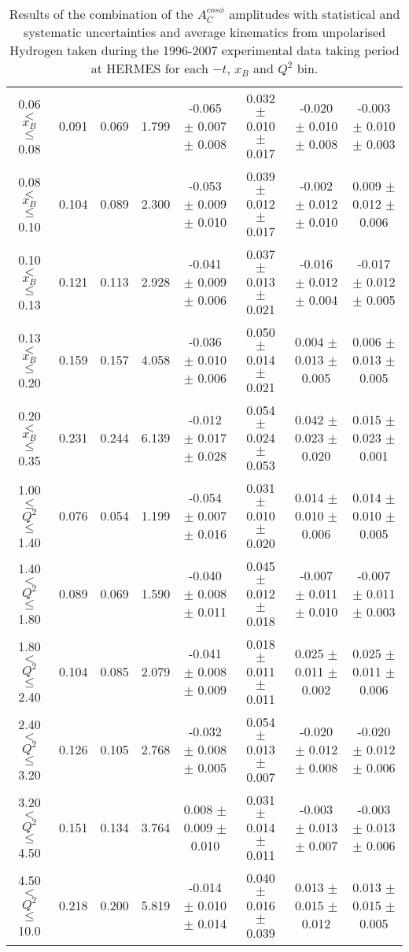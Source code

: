 {\begin{table}[width=15cm]
\begin{center}
{\begin{tabular}{|c|c|c|c|c|c|c|c|}
0.06 $<$ $x_{B}$ $\leqslant$ 0.08 &  0.091 & 0.069 &  1.799 &   -0.065  $\pm$  0.007  $\pm$   0.008 &
0.032  $\pm$  0.010  $\pm$   0.017 & -0.020  $\pm$ 0.010  $\pm$   0.008 & -0.003   $\pm$  0.010   $\pm$   0.003\\
0.08 $<$ $x_{B}$ $\leqslant$ 0.10 &  0.104 & 0.089 &  2.300 &  -0.053  $\pm$  0.009  $\pm$   0.010 & 
0.039  $\pm$  0.012  $\pm$   0.017 & -0.002 $\pm$  0.012 $\pm$    0.010 & 0.009   $\pm$  0.012    $\pm$  0.006\\
0.10 $<$ $x_{B}$ $\leqslant$ 0.13 &  0.121 &  0.113 &  2.928 &  -0.041  $\pm$  0.009  $\pm$   0.006 & 
0.037  $\pm$  0.013 $\pm$   0.021 & -0.016 $\pm$  0.012  $\pm$   0.004 & -0.017   $\pm$  0.012  $\pm$    0.005\\
0.13 $<$ $x_{B}$ $\leqslant$ 0.20 &  0.159 & 0.157 &  4.058&   -0.036   $\pm$ 0.010  $\pm$   0.006 & 
0.050  $\pm$  0.014 $\pm$    0.021 & 0.004  $\pm$  0.013  $\pm$   0.005 & 0.006   $\pm$  0.013   $\pm$  0.005\\
0.20 $<$ $x_{B}$ $\leqslant$ 0.35 &  0.231 & 0.244 &  6.139 &  -0.012 $\pm$  0.017   $\pm$  0.028 & 
0.054  $\pm$  0.024   $\pm$    0.053 & 0.042  $\pm$  0.023  $\pm$   0.020 & 0.015  $\pm$   0.023  $\pm$   0.001\\
\hline
1.00 $\leqslant$ $Q^{2}$ $\leqslant$ 1.40 &  0.076 & 0.054  & 1.199 &  -0.054  $\pm$  0.007  $\pm$   0.016 & 
0.031  $\pm$  0.010  $\pm$   0.020 &  0.014 $\pm$  0.010  $\pm$  0.006 & 0.014  $\pm$  0.010   $\pm$   0.005\\
1.40 $<$ $Q^{2}$ $\leqslant$ 1.80 &  0.089 & 0.069 &  1.590 &  -0.040  $\pm$  0.008  $\pm$   0.011 & 
0.045  $\pm$  0.012  $\pm$   0.018 & -0.007  $\pm$  0.011  $\pm$  0.010 & -0.007  $\pm$  0.011   $\pm$  0.003\\
1.80 $<$ $Q^{2}$ $\leqslant$ 2.40 &  0.104 & 0.085 &  2.079 &  -0.041  $\pm$  0.008  $\pm$   0.009 &
 0.018  $\pm$  0.011  $\pm$   0.011 & 0.025 $\pm$   0.011  $\pm$  0.002 & 0.025  $\pm$   0.011  $\pm$  0.006\\
2.40 $<$ $Q^{2}$ $\leqslant$ 3.20 &  0.126 & 0.105  & 2.768 &  -0.032 $\pm$   0.008  $\pm$   0.005 &  
0.054  $\pm$  0.013  $\pm$   0.007 & -0.020  $\pm$  0.012  $\pm$  0.008 & -0.020  $\pm$  0.012  $\pm$  0.006\\
3.20 $<$ $Q^{2}$ $\leqslant$ 4.50 &  0.151 & 0.134 &  3.764 &  0.008  $\pm$  0.009   $\pm$  0.010 & 
0.031 $\pm$   0.014  $\pm$   0.011 & -0.003  $\pm$  0.013 $\pm$ 0.007 & -0.003   $\pm$  0.013  $\pm$  0.006\\
4.50 $<$ $Q^{2}$ $\leqslant$ 10.0 &  0.218 & 0.200 &  5.819 &  -0.014  $\pm$  0.010  $\pm$   0.014 & 
0.040  $\pm$  0.016  $\pm$  0.039 & 0.013 $\pm$   0.015  $\pm$  0.012 & 0.013   $\pm$  0.015   $\pm$   0.005\\
\hline
  \end{tabular}
}
 \end{center}
\caption{Results of the combination of the $A_{C}^{cos\phi}$ amplitudes with statistical and systematic uncertainties and average kinematics from unpolarised Hydrogen taken during
the 1996-2007 experimental data taking period at HERMES for each $-t$, $x_{B}$ and $Q^{2}$ bin.}
\end{table}
}